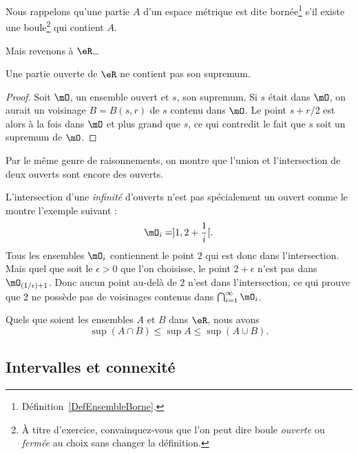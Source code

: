 Nous rappelons qu'une partie $A$ d'un espace métrique est dite bornée\footnote{Définition~\ref{DefEnsembleBorne}.} s'il existe une boule\footnote{À titre d'exercice, convainquez-vous que l'on peut dire boule \emph{ouverte} ou \emph{fermée} au choix sans changer la définition.} qui contient $A$.

Mais revenons à \( \eR \)\dots
\begin{lemma}  \label{LemSupOuvPas}
    Une partie ouverte de \( \eR\) ne contient pas son supremum.
\end{lemma}

\begin{proof}
Soit $\mO$, un ensemble ouvert et $s$, son supremum. Si $s$ était dans $\mO$, on aurait un voisinage $B=B(s,r)$ de $s$ contenu dans $\mO$. Le point $s+r/2$ est alors à la fois dans $\mO$ et plus grand que $s$, ce qui contredit le fait que $s$ soit un supremum de $\mO$.
\end{proof}

Par le même genre de raisonnements, on montre que l'union et l'intersection de deux ouverts sont encore des ouverts.

\begin{remark}
L'intersection d'une \emph{infinité} d'ouverts n'est pas spécialement un ouvert comme le montre l'exemple suivant :
\[
  \mO_i=]1,2+\frac{ 1 }{ i }[.
\]
Tous les ensembles $\mO_i$ contiennent le point $2$ qui est donc dans l'intersection. Mais quel que soit le $\epsilon>0$ que l'on choisisse, le point $2+\epsilon$ n'est pas dans $\mO_{(1/\epsilon)+1}$. Donc aucun point au-delà de $2$ n'est dans l'intersection, ce qui prouve que $2$ ne possède pas de voisinages contenus dans $\bigcap_{i=1}^{\infty}\mO_i$.
\end{remark}

\begin{proposition}     \label{PROPooANIOooIJHelX}
Quels que soient les ensembles $A$ et $B$ dans $\eR$, nous avons
\[
  \sup(A\cap B)\leq\sup A\leq\sup(A\cup B).
\]
\end{proposition}

\subsection{Intervalles et connexité}

